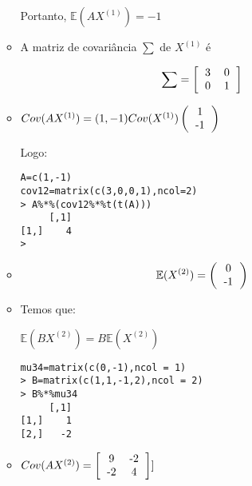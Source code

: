 \documentclass[11pt,a4paper]{book}
\begin{document}
\begin{enumerate}
\begin{itemize}
					Portanto, $\mathbb{E}(AX^{(1)})=-1$
					
					\item
					A matriz de covariância $\sum$ de $X^{(1)}$ é
					
					\begin{eqnarray*}
						\sum = \left[
						\begin{tabular}{c c}
						3 & 0\\
						0 & 1\\
						\end{tabular}
						\right]
					\end{eqnarray*}
					
					\item
					$Cov(AX^{(1)})=(1,-1)Cov(X^{(1)})\left(
					\begin{tabular}{c}
					1\\
					-1\\
					\end{tabular}
					\right)$
					
					Logo:
					\begin{lstlisting}
A=c(1,-1)
cov12=matrix(c(3,0,0,1),ncol=2)
> A%*%(cov12%*%t(t(A)))
     [,1]
[1,]    4
> 
					\end{lstlisting}
					
					\item
					\begin{eqnarray*}
						\mathbb{E}(X^{(2)})=\left(
						\begin{tabular}{c}
						0\\
						-1\\
						\end{tabular}
						\right)
					\end{eqnarray*}
					
					\item
					Temos que:
					
					$\mathbb{E}(BX^{(2)})=B\mathbb{E}(X^{(2)})$
					
					\begin{lstlisting}
mu34=matrix(c(0,-1),ncol = 1)
> B=matrix(c(1,1,-1,2),ncol = 2)
> B%*%mu34
     [,1]
[1,]    1
[2,]   -2
					\end{lstlisting}
					\item
					$Cov(AX^{(2)})=\left[
					\begin{tabular}{c c}
					9 & -2\\
					-2 & 4\\
					\end{tabular}
					\right]
					]$
					

\end{itemize}
\end{enumerate}
\end{document}
